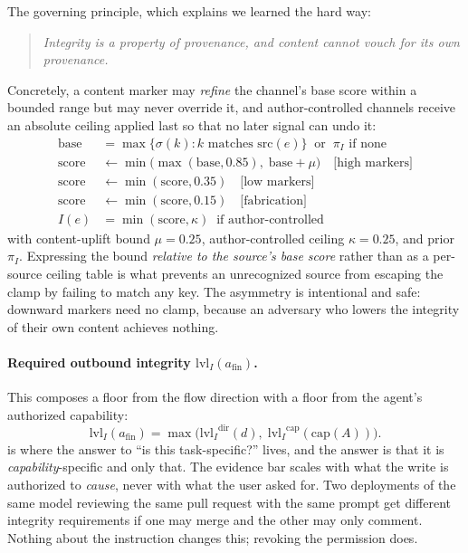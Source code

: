 \documentclass[conference,compsoc]{IEEEtran}
\newcommand{\Il}{\ensuremath{I}}                 %
\newcommand{\lvlI}{\ensuremath{\mathrm{lvl}_I}}  %
\newcommand{\afin}{\ensuremath{a_{\mathrm{fin}}}}
\begin{document}
The governing principle, which  explains we learned
the hard way:
\begin{quote}
\emph{Integrity is a property of provenance, and content cannot vouch for its
own provenance.}
\end{quote}
Concretely, a content marker may \emph{refine} the channel's base score within
a bounded range but may never override it, and author-controlled channels
receive an absolute ceiling applied last so that no later signal can undo it:
\begin{align}
\text{base}   &= \textstyle\max\{\sigma(k) : k \text{ matches } \mathrm{src}(e)\}
                 \;\;\text{or}\;\; \pi_I \text{ if none}\\
\text{score}  &\leftarrow \min\!\big(\max(\text{base}, 0.85),\;
                 \text{base} + \mu\big) \quad \text{[high markers]}\\
\text{score}  &\leftarrow \min(\text{score}, 0.35) \quad \text{[low markers]}\\
\text{score}  &\leftarrow \min(\text{score}, 0.15) \quad \text{[fabrication]}\\
\Il(e)        &= \min(\text{score}, \kappa) \;\;\text{if author-controlled}
\end{align}
with content-uplift bound $\mu = 0.25$, author-controlled ceiling
$\kappa = 0.25$, and prior $\pi_I$. Expressing the bound \emph{relative to the
source's base score} rather than as a per-source ceiling table is what prevents
an unrecognized source from escaping the clamp by failing to match any key.
The asymmetry is intentional and safe: downward markers need no clamp, because
an adversary who lowers the integrity of their own content achieves nothing.

\paragraph{Required outbound integrity $\lvlI(\afin)$.} This composes a floor
from the flow direction with a floor from the agent's authorized capability:
\begin{equation}
\lvlI(\afin) = \max\big(\lvlI^{\mathrm{dir}}(d),\;
                        \lvlI^{\mathrm{cap}}(\mathrm{cap}(A))\big).
\label{eq:lvlI}
\end{equation}
 is where the answer to ``is this task-specific?'' lives, and the
answer is that it is \emph{capability}-specific and only that. The evidence bar
scales with what the write is authorized to \emph{cause}, never with what the
user asked for. Two deployments of the same model reviewing the same pull
request with the same prompt get different integrity requirements if one may
merge and the other may only comment. Nothing about the instruction changes
this; revoking the permission does.
\end{document}
